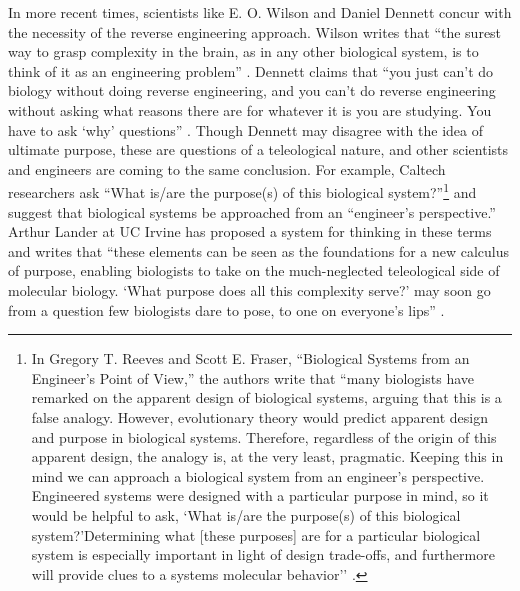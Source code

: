 In more recent times, scientists like E. O. Wilson and Daniel Dennett
concur with the necessity of the reverse engineering approach. Wilson
writes that “the surest way to grasp complexity in the brain, as in any
other biological system, is to think of it as an engineering
problem” \citep[][p.~112]{wilson1998}. Dennett claims that ``you just can’t do
biology without doing reverse engineering, and you can’t do reverse
engineering without asking what reasons there are for whatever it is
you are studying. You have to ask `why' questions'' \citep[][p.~213]{dennett1996}.
Though Dennett may disagree with the idea of ultimate purpose, these
are questions of a teleological nature, and other scientists and
engineers are coming to the same conclusion. For example, Caltech
researchers ask “What is/are the purpose(s) of this biological
system?”\footnote{%
In Gregory T. Reeves and Scott E. Fraser,
“Biological Systems from an Engineer’s Point of View,” 
the authors write that ``many biologists have remarked on the apparent
design of biological systems, arguing that this is a false analogy.
However, evolutionary theory would predict apparent design and purpose
in biological systems. Therefore, regardless of the origin of this
apparent design, the analogy is, at the very least, pragmatic. Keeping
this in mind we can approach a biological system from an engineer’s
perspective. Engineered systems were designed with a particular purpose
in mind, so it would be helpful to ask, `What is/are the purpose(s) of
this biological system?'{\jdots}Determining what [these purposes] are for a
particular biological system is especially important in light of design
trade-offs, and furthermore will provide clues to a systems molecular
behavior'’ \citep{reevesfraser2009}.
} and suggest that biological systems be
approached from an “engineer’s perspective.” Arthur Lander at UC Irvine
has proposed a system for thinking in these terms and writes that
``these elements can be seen as the foundations for a new calculus of
purpose, enabling biologists to take on the much-neglected teleological
side of molecular biology. `What purpose does all this complexity
serve?' may soon go from a question few biologists dare to pose, to one
on everyone’s lips'' \citep{lander2004}.

